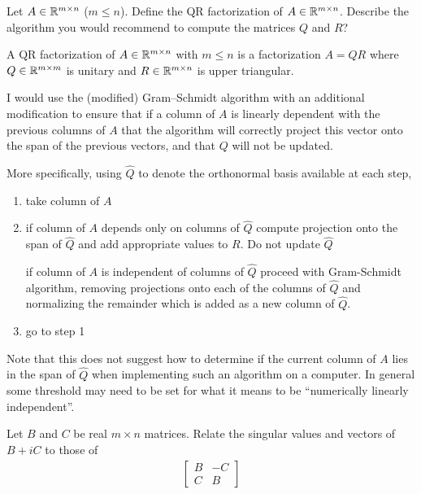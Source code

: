 \documentclass[10pt]{article}
\begin{document}
\begin{problem}
Let \( A\in \mathbb{R}^{m\times n} \) (\( m\leq n \)). Define the QR factorization of \( A\in \mathbb{R}^{m\times n} \).
Describe the algorithm you would recommend to compute the matrices
\( Q \) and \( R \)?
\end{problem}

\begin{solution}[Solution]
A QR factorization of \( A\in \mathbb{R}^{m\times n} \) with \( m\leq n \) is a factorization \( A = QR \) where \( Q \in \mathbb{R}^{m\times m} \) is unitary and \( R \in \mathbb{R}^{m\times n} \) is upper triangular.

I would use the (modified) Gram--Schmidt algorithm with an additional modification to ensure that if a column of \( A \) is linearly dependent with the previous columns of \( A \) that the algorithm will correctly project this vector onto the span of the previous vectors, and that \( Q \) will not be updated.

More specifically, using \( \hat{Q} \) to denote the orthonormal basis available at each step,
\begin{enumerate}[nolistsep]
    \item take column of \( A \)
    \item if column of \( A \) depends only on columns of \( \hat{Q} \) compute projection onto the span of \( \hat{Q} \) and add appropriate values to \( R \). Do not update \( \hat{Q} \)

    if column of \( A \) is independent of columns of \( \hat{Q} \) proceed with Gram-Schmidt algorithm, removing projections onto each of the columns of \( \hat{Q} \) and normalizing the remainder which is added as a new column of \( \hat{Q} \).

    \item go to step 1
\end{enumerate}

Note that this does not suggest how to determine if the current column of \( A \) lies in the span of \( \hat{Q} \) when implementing such an algorithm on a computer. In general some threshold may need to be set for what it means to be ``numerically linearly independent''.

\end{solution}

\begin{problem}
Let \( B \) and \( C \) be real \( m\times n \) matrices. Relate the singular values and vectors of \( B+iC \) to those of
\begin{align*}
    \left[\begin{array}{cc}B & -C \\ C & B\end{array}\right]
\end{align*}
\end{problem}
\end{document}
